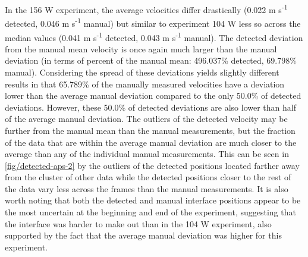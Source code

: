 In the 156 W experiment, the average velocities differ
drastically (0.022 m s\textsuperscript{-1} detected,
0.046 m s\textsuperscript{-1} manual) but similar to
experiment 104 W less so across the median values
(0.041 m s\textsuperscript{-1} detected,
0.043 m s\textsuperscript{-1} manual).
The detected deviation from the manual mean
velocity is once again much larger than the manual deviation (in terms
of percent of the manual mean: 496.037\% detected, 69.798\% manual).
Considering the spread of these deviations yields slightly different
results in that 65.789\% of the manually measured velocities have a
deviation lower than the average manual deviation compared to the only
50.0\% of detected deviations. However, these 50.0\% of detected
deviations are also lower than half of the average manual deviation.
The outliers of the detected velocity may be further from the manual mean
than the manual measurements, but the fraction of the data that are
within the average manual deviation are much closer to the average than any
of the individual manual measurements. This can be seen in
\ref{fig/detected-aps-2} by the outliers of the detected positions
located farther away from the cluster of other data while the detected
positions closer to the rest of the data vary less across the frames than
the manual measurements. It is also worth noting that both the detected and
manual interface positions appear to be the most uncertain at the beginning
and end of the experiment, suggesting that the interface was harder to make
out than in the 104 W experiment, also supported by the fact that the
average manual deviation was higher for this experiment.

